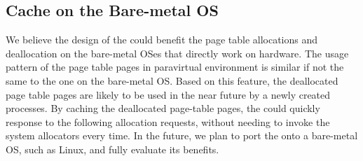 
\subsection{\name Cache on the Bare-metal OS}
We believe the design of the \cache could benefit the page table allocations and deallocation on the bare-metal OSes that directly work on hardware.
The usage pattern of the page table pages in paravirtual environment is similar if not the same to the one on the bare-metal OS.
Based on this feature, the deallocated page table pages are likely to be used in the near future by a newly created processes.
By caching the deallocated page-table pages, the \cache could quickly response to the following allocation requests, without needing to invoke the system allocators every time.
In the future, we plan to port the \cache onto a bare-metal OS, such as Linux, and fully evaluate its benefits.
